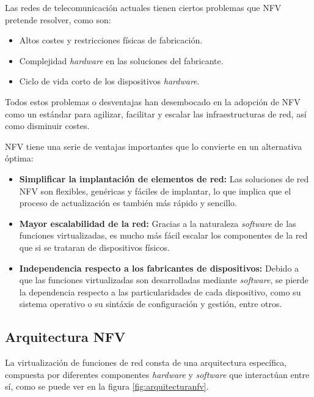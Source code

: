 Las redes de telecomunicación actuales tienen ciertos problemas que \ac{NFV} pretende resolver, como son:

\begin{itemize}
	\item Altos costes y restricciones físicas de fabricación.
	\item Complejidad \textit{hardware} en las soluciones del fabricante.
	\item Ciclo de vida corto de los dispositivos \textit{hardware}.
\end{itemize}

Todos estos problemas o desventajas han desembocado en la adopción de \ac{NFV} como un estándar para agilizar, facilitar y escalar las infraestructuras de red, así como disminuir costes.

\ac{NFV} tiene una serie de ventajas importantes que lo convierte en un alternativa óptima:

\begin{itemize}
	\item \textbf{Simplificar la implantación de elementos de red:} Las soluciones de red \ac{NFV} son flexibles, genéricas y fáciles de implantar, lo que implica que el proceso de actualización es también más rápido y sencillo.
	
	\item \textbf{Mayor escalabilidad de la red:} Gracias a la naturaleza \textit{software} de las funciones virtualizadas, es mucho más fácil escalar los componentes de la red que si se trataran de dispositivos físicos.
	
	\item \textbf{Independencia respecto a los fabricantes de dispositivos:} Debido a que las funciones virtualizadas son desarrolladas mediante \textit{software}, se pierde la dependencia respecto a las particularidades de cada dispositivo, como su sistema operativo o su sintáxis de configuración y gestión, entre otros.
\end{itemize}

\subsection{Arquitectura NFV}
\label{subsec:nfvarq}

La virtualización de funciones de red consta de una arquitectura específica, compuesta por diferentes componentes \textit{hardware} y \textit{software} que interactúan entre sí, como se puede ver en la figura \ref{fig:arquitecturanfv}.

